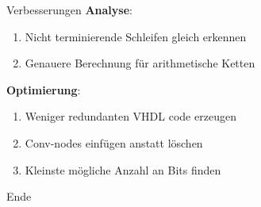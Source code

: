 \begin{frame}{Verbesserungen}
\textbf{Analyse}:
\begin{enumerate}
    \item Nicht terminierende Schleifen gleich erkennen
    \item Genauere Berechnung für arithmetische Ketten
\end{enumerate}
\textbf{Optimierung}:
\begin{enumerate}
	\item Weniger redundanten VHDL code erzeugen
	\item Conv-nodes einfügen anstatt löschen
	\item Kleinste mögliche Anzahl an Bits finden
\end{enumerate}
\end{frame}

\begin{frame}{Ende}
\end{frame}